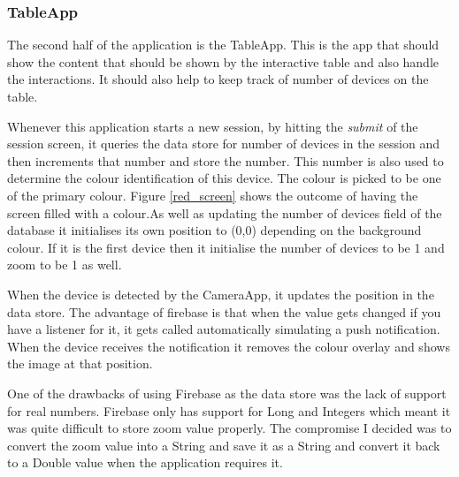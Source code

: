 \subsubsection{TableApp} \label{tableapp}

The second half of the application is the TableApp. This is the app that should show the content that should be shown by the interactive table and also handle the interactions. It should also help to keep track of number of devices on the table.

Whenever this application starts a new session, by hitting the \emph{submit} of the session screen, it queries the data store for number of devices in the session and then increments that number and store the number. This number is also used to determine the colour identification of this device. The colour is picked to be one of the primary colour. Figure \ref{red_screen} shows the outcome of having the screen filled with a colour.As well as updating the number of devices field of the database it initialises its own position to (0,0) depending on the background colour. If it is the first device then it initialise the number of devices to be 1 and zoom to be 1 as well.

When the device is detected by the CameraApp, it updates the position in the data store. The advantage of firebase is that when the value gets changed if you have a listener for it, it gets called automatically simulating a push notification. When the device receives the notification it removes the colour overlay and shows the image at that position.

One of the drawbacks of using Firebase as the data store was the lack of support for real numbers. Firebase only has support for Long and Integers which meant it was quite difficult to store zoom value properly. The compromise I decided was to convert the zoom value into a String and save it as a String and convert it back to a Double value when the application requires it.


